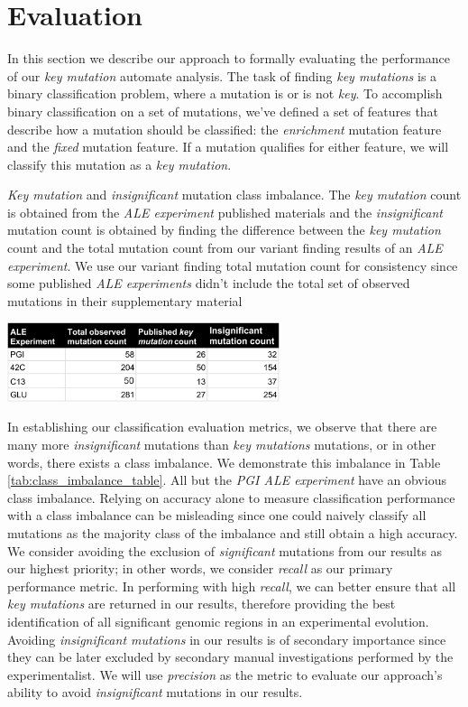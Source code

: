 \documentclass[12pt,final,masters,chapterheads]{ucsd}  %
\begin{document}
\section{Evaluation}
In this section we describe our approach to formally evaluating the performance of our \textit{key mutation} automate analysis. The task of finding \textit{key mutations} is a binary classification problem, where a mutation is or is not \textit{key}. To accomplish binary classification on a set of mutations, we've defined a set of features that describe how a mutation should be classified: the \textit{enrichment} mutation feature and the \textit{fixed} mutation feature. If a mutation qualifies for either feature, we will classify this mutation as a \textit{key mutation}.
\begin{table}[H]
  \caption{\textit{Key mutation} and \textit{insignificant} mutation class imbalance. The \textit{key mutation} count is obtained from the \textit{ALE experiment} published materials and the \textit{insignificant} mutation count is obtained by finding the difference between the \textit{key mutation} count and the total mutation count from our variant finding results of an \textit{ALE experiment}. We use our variant finding total mutation count for consistency since some published \textit{ALE experiments} didn't include the total set of observed mutations in their supplementary material}
  \centering
  \includegraphics[width=0.6\textwidth]{class_imbalance_table.png}
  \label{tab:class_imbalance_table}
\end{table}
In establishing our classification evaluation metrics, we observe that there are many more \textit{insignificant} mutations than \textit{key mutations} mutations, or in other words, there exists a class imbalance. We demonstrate this imbalance in Table \ref{tab:class_imbalance_table}. All but the \textit{PGI ALE experiment} have an obvious class imbalance. Relying on accuracy alone to measure classification performance with a class imbalance can be misleading since one could naively classify all mutations as the majority class of the imbalance and still obtain a high accuracy. We consider avoiding the exclusion of \textit{significant} mutations from our results as our highest priority; in other words, we consider \textit{recall} as our primary performance metric. In performing with high \textit{recall}, we can better ensure that all \textit{key mutations} are returned in our results, therefore providing the best identification of all significant genomic regions in an experimental evolution. Avoiding \textit{insignificant mutations} in our results is of secondary importance since they can be later excluded by secondary manual investigations performed by the experimentalist. We will use \textit{precision} as the metric to evaluate our approach's ability to avoid \textit{insignificant} mutations in our results.
\end{document}
